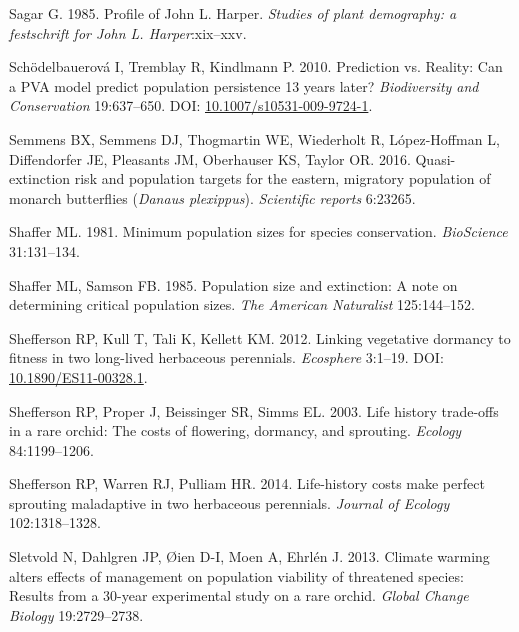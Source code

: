 \documentclass[
  12pt,
  letterpaper,
]{book}
\newlength{\cslhangindent}
\newenvironment{CSLReferences}[2] %
 {\begin{list}{}{%
  \setlength{\itemindent}{0pt}
  \setlength{\leftmargin}{0pt}
  \setlength{\parsep}{0pt}
  \ifodd #1
   \setlength{\leftmargin}{\cslhangindent}
   \setlength{\itemindent}{-1\cslhangindent}
  \fi
  \setlength{\itemsep}{#2\baselineskip}}}
 {\end{list}}
\begin{document}
\begin{CSLReferences}{1}{0}
Sagar G. 1985. Profile of {J}ohn {L}. {H}arper. \emph{Studies of plant
demography: a festschrift for {J}ohn {L.} {H}arper}:xix--xxv.

Schödelbauerová I, Tremblay R, Kindlmann P. 2010. Prediction vs.
Reality: Can a PVA model predict population persistence 13 years later?
\emph{Biodiversity and Conservation} 19:637--650. DOI:
\href{https://doi.org/10.1007/s10531-009-9724-1}{10.1007/s10531-009-9724-1}.

Semmens BX, Semmens DJ, Thogmartin WE, Wiederholt R, López-Hoffman L,
Diffendorfer JE, Pleasants JM, Oberhauser KS, Taylor OR. 2016.
Quasi-extinction risk and population targets for the eastern, migratory
population of monarch butterflies (\emph{{D}anaus {p}lexippus}).
\emph{Scientific reports} 6:23265.

Shaffer ML. 1981. Minimum population sizes for species conservation.
\emph{BioScience} 31:131--134.

Shaffer ML, Samson FB. 1985. Population size and extinction: A note on
determining critical population sizes. \emph{The American Naturalist}
125:144--152.

Shefferson RP, Kull T, Tali K, Kellett KM. 2012. Linking vegetative
dormancy to fitness in two long-lived herbaceous perennials.
\emph{Ecosphere} 3:1--19. DOI:
\href{https://doi.org/10.1890/ES11-00328.1}{10.1890/ES11-00328.1}.

Shefferson RP, Proper J, Beissinger SR, Simms EL. 2003. Life history
trade-offs in a rare orchid: The costs of flowering, dormancy, and
sprouting. \emph{Ecology} 84:1199--1206.

Shefferson RP, Warren RJ, Pulliam HR. 2014. Life-history costs make
perfect sprouting maladaptive in two herbaceous perennials.
\emph{Journal of Ecology} 102:1318--1328.

Sletvold N, Dahlgren JP, Øien D-I, Moen A, Ehrlén J. 2013. Climate
warming alters effects of management on population viability of
threatened species: Results from a 30-year experimental study on a rare
orchid. \emph{Global Change Biology} 19:2729--2738.


\end{CSLReferences}
\end{document}
